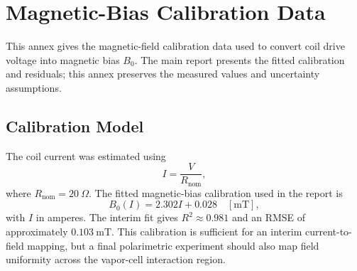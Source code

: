 \documentclass{ieeeaccess}
\begin{document}
\section{Magnetic-Bias Calibration Data}
\label{annex:magnetic_calibration}

This annex gives the magnetic-field calibration data used to convert coil drive voltage into magnetic bias \(B_0\). The main report presents the fitted calibration and residuals; this annex preserves the measured values and uncertainty assumptions.

\subsection{Calibration Model}
\label{annex:magnetic_model}

The coil current was estimated using
\begin{equation}
I
=
\frac{V}{R_{\mathrm{nom}}},
\label{eq:annex_current_from_voltage}
\end{equation}
where \(R_{\mathrm{nom}}=20~\Omega\). The fitted magnetic-bias calibration used in the report is
\begin{equation}
B_0(I)
=
2.302I+0.028
\quad [\mathrm{mT}],
\label{eq:annex_b0_calibration}
\end{equation}
with \(I\) in amperes. The interim fit gives \(R^2\approx0.981\) and an RMSE of approximately \(0.103~\mathrm{mT}\). This calibration is sufficient for an interim current-to-field mapping, but a final polarimetric experiment should also map field uniformity across the vapor-cell interaction region.
\end{document}
